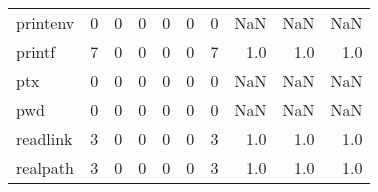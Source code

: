 \begin{tabular}{lrrrrrrrrr}
printenv  &                                       0 &                                                  0 &                                                  0 &                                                  0 &                                                  0 &                                                  0 &                                                NaN &                                    NaN &                                  NaN \\
printf    &                                       7 &                                                  0 &                                                  0 &                                                  0 &                                                  0 &                                                  7 &                                                1.0 &                                    1.0 &                                  1.0 \\
ptx       &                                       0 &                                                  0 &                                                  0 &                                                  0 &                                                  0 &                                                  0 &                                                NaN &                                    NaN &                                  NaN \\
pwd       &                                       0 &                                                  0 &                                                  0 &                                                  0 &                                                  0 &                                                  0 &                                                NaN &                                    NaN &                                  NaN \\
readlink  &                                       3 &                                                  0 &                                                  0 &                                                  0 &                                                  0 &                                                  3 &                                                1.0 &                                    1.0 &                                  1.0 \\
realpath  &                                       3 &                                                  0 &                                                  0 &                                                  0 &                                                  0 &                                                  3 &                                                1.0 &                                    1.0 &                                  1.0 \\

\end{tabular}

